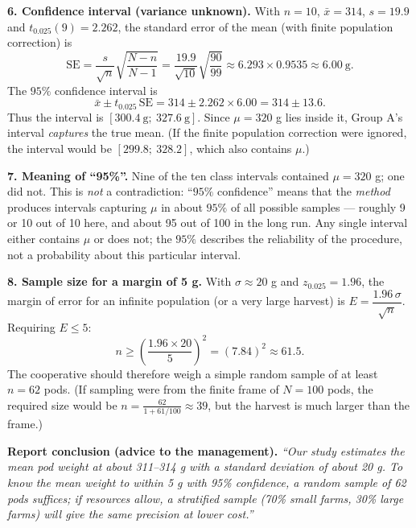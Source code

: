 \documentclass[11pt]{article}
\begin{document}
\textbf{6. Confidence interval (variance unknown).} With $n = 10$, $\bar{x} = 314$, $s = 19.9$ and $t_{0.025}(9) = 2.262$, the standard error of the mean (with finite population correction) is
\[ \mathrm{SE} = \frac{s}{\sqrt{n}}\sqrt{\frac{N-n}{N-1}} = \frac{19.9}{\sqrt{10}}\sqrt{\frac{90}{99}} \approx 6.293 \times 0.9535 \approx 6.00\ \text{g}. \]
The $95\%$ confidence interval is
\[ \bar{x} \pm t_{0.025}\,\mathrm{SE} = 314 \pm 2.262 \times 6.00 = 314 \pm 13.6. \]
Thus the interval is $[300.4\ \text{g};\ 327.6\ \text{g}]$. Since $\mu = 320$ g lies inside it, Group A's interval \emph{captures} the true mean. (If the finite population correction were ignored, the interval would be $[299.8;\ 328.2]$, which also contains $\mu$.)

\textbf{7. Meaning of ``95\%''.} Nine of the ten class intervals contained $\mu = 320$ g; one did not. This is \emph{not} a contradiction: ``$95\%$ confidence'' means that the \emph{method} produces intervals capturing $\mu$ in about $95\%$ of all possible samples — roughly 9 or 10 out of 10 here, and about 95 out of 100 in the long run. Any single interval either contains $\mu$ or does not; the $95\%$ describes the reliability of the procedure, not a probability about this particular interval.

\textbf{8. Sample size for a margin of 5 g.} With $\sigma \approx 20$ g and $z_{0.025} = 1.96$, the margin of error for an infinite population (or a very large harvest) is $E = \dfrac{1.96\,\sigma}{\sqrt{n}}$. Requiring $E \le 5$:
\[ n \ge \left(\frac{1.96 \times 20}{5}\right)^2 = (7.84)^2 \approx 61.5. \]
The cooperative should therefore weigh a simple random sample of at least $\boxed{n = 62}$ pods. (If sampling were from the finite frame of $N=100$ pods, the required size would be $n = \frac{62}{1 + 61/100} \approx 39$, but the harvest is much larger than the frame.)

\textbf{Report conclusion (advice to the management).} \emph{``Our study estimates the mean pod weight at about 311--314 g with a standard deviation of about 20 g. To know the mean weight to within 5 g with 95\% confidence, a random sample of 62 pods suffices; if resources allow, a stratified sample (70\% small farms, 30\% large farms) will give the same precision at lower cost.''}
\end{document}

